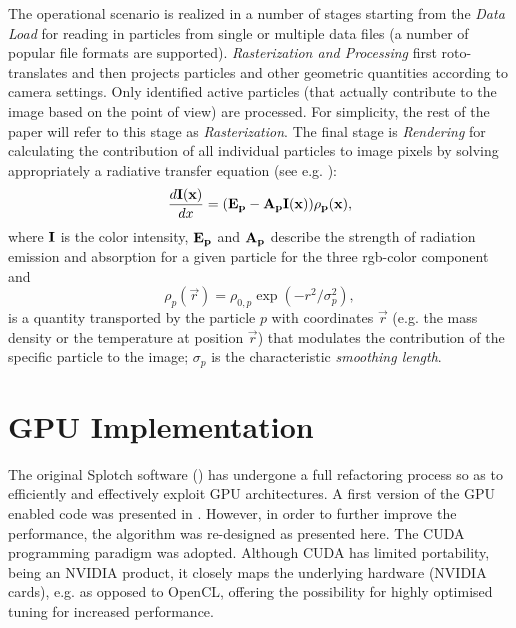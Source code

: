 The operational scenario is realized in a number of stages  starting from the {\it Data Load} for reading in particles from single or multiple data files (a number of popular file formats are supported). {\it Rasterization and Processing}  first roto-translates and then projects particles and other geometric quantities according to camera settings. Only identified active particles (that actually contribute to the image based on the point of view) are processed. For simplicity, the rest of the paper will refer to this stage as {\it Rasterization}. The final stage is {\it Rendering} for calculating the contribution of all individual particles to image pixels by solving appropriately a radiative transfer equation (see e.g. \citet{1991par..book.....S}):
\begin{equation}\label{rad}
\frac{d\bf{I}(x)}{dx}=(\bf{E}_p-\bf{A}_p\bf{I}(x))\rho_p(x),
\end{equation}
where $\bf{I}$ is the color intensity, $\bf{E}_p$ and $\bf{A}_p$ describe the strength of radiation emission and absorption for a given particle for the three rgb-color component and 
\begin{equation}\label{smooth}
\rho_p(\vec r)=\rho_{0,p}\exp(-r^2/\sigma_p^2),
\end{equation}
is a quantity transported by the particle $p$ with coordinates $\vec r$ (e.g. the mass density or the temperature at position $\vec r$) that modulates the contribution of the specific particle to the image; $\sigma_p$ is the characteristic {\it smoothing length}.

\section{GPU Implementation}

The original Splotch software (\citet{2008NJPh...10l5006D}) has undergone a full refactoring process so as to efficiently and effectively exploit GPU architectures. A first version of the GPU enabled code was presented in \citet{jin:high-performance}. However, in order to further improve the performance, the algorithm was re-designed as presented here. The CUDA programming paradigm was adopted. Although CUDA has limited portability, being an NVIDIA product, it closely maps the underlying hardware (NVIDIA cards), e.g. as opposed to OpenCL, offering the possibility for highly optimised tuning for increased performance.

